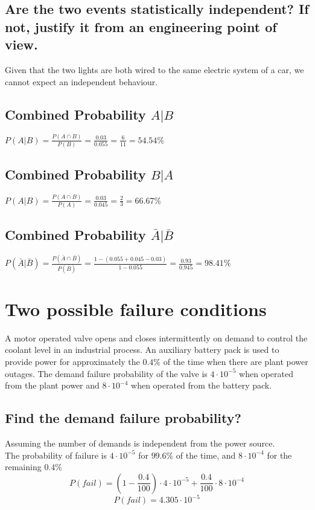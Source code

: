 \documentclass{article}
\begin{document}
\subsection{Are the two events statistically independent? If not, justify it from an engineering point of view.}
Given that the two lights are both wired to the same electric system of a car, we cannot expect an independent behaviour.

\subsection{Combined Probability $A|B$}
$P(A|B) = \frac{P(A \cap B)}{P(B)} = \frac{0.03}{0.055} = \frac{6}{11} = 54.54\%$

\subsection{Combined Probability $B|A$}
$P(A|B) = \frac{P(A \cap B)}{P(A)} = \frac{0.03}{0.045} = \frac{2}{3} = 66.67\%$

\subsection{Combined Probability $\bar A | \bar B$}
$P(\bar A| \bar B) = \frac{P(\bar A \cap \bar B)}{P(\bar B)} = \frac{1 - (0.055 + 0.045 - 0.03)}{1-0.055} = \frac{0.93}{0.945} = 98.41\%$

\newpage
\section{Two possible failure conditions}
A motor operated valve opens and closes intermittently on demand to control the
coolant level in an industrial process. An auxiliary battery pack is used to provide
power for approximately the $0.4\%$ of the time when there are plant power
outages. The demand failure probability of the valve is $4 \cdot 10^{-5}$ when operated
from the plant power and $8 \cdot 10^{-4}$ when operated from the battery pack.

\subsection{Find the demand failure probability?}
Assuming the number of demands is independent from the power source.\\
The probability of failure is $4 \cdot 10^{-5}$ for $99.6\%$ of the time, and $8 \cdot 10^{-4}$ for the remaining $0.4\%$
\begin{equation}
    P(fail) = \left( 1 - \frac{0.4}{100}\right) \cdot 4 \cdot 10^{-5} + \frac{0.4}{100}\cdot 8 \cdot 10^{-4}
\end{equation}
\begin{equation}
    P(fail) = 4.305 \cdot 10^{-5}
\end{equation}
\end{document}
